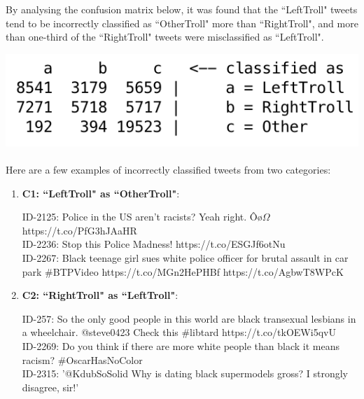 \documentclass[11pt]{article}
\begin{document}
By analysing the confusion matrix below, it was found that the ``LeftTroll" tweets tend to be incorrectly classified as ``OtherTroll" more than ``RightTroll", and more than one-third of the ``RightTroll" tweets were misclassified as ``LeftTroll".


\includegraphics[scale=0.65]{"conf-matrix"}

\paragraph{} Here are a few examples of incorrectly classified tweets from two categories:

\begin{enumerate}

\item
\textbf{C1: ``LeftTroll" as ``OtherTroll"}:

ID-2125: Police in the US aren't racists? Yeah right. Ôø$\Omega$ https://t.co/PfG3hJAaHR \\

ID-2236: Stop this Police Madness!  https://t.co/ESGJf6otNu \\

ID-2267: Black teenage girl sues white police officer for brutal assault in car park \#BTPVideo  https://t.co/MGn2HePHBf https://t.co/AgbwT8WPcK


\item
\textbf{C2: ``RightTroll" as ``LeftTroll"}:

ID-257: So the only good people in this world are black transexual lesbians in a wheelchair. @steve0423 Check this \#libtard https://t.co/tkOEWi5qvU \\

ID-2269: Do you think if there are more white people than black it means racism?  \#OscarHasNoColor \\

ID-2315: ’@KdubSoSolid Why is dating black supermodels gross? I strongly disagree, sir!' \\

\end{enumerate}
\end{document}
